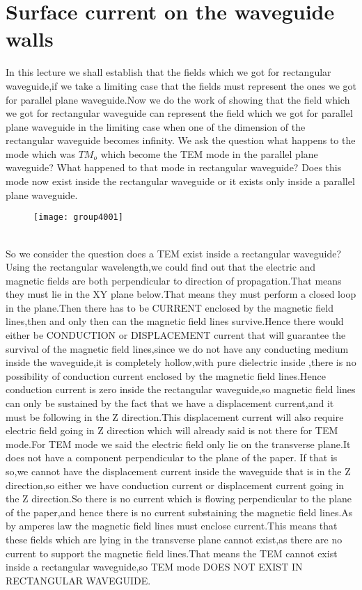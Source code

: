 \chapter{Surface current on the waveguide walls}
	In this lecture we shall establish that the fields which we got for rectangular waveguide,if we take a limiting case that the fields must represent the ones we got for parallel plane waveguide.Now we do the work of showing that the field which we got for rectangular waveguide can represent the field which we got for parallel plane waveguide in the limiting case when one of the dimension of the rectangular waveguide becomes infinity. We ask the question what happens to the mode which was $TM_o$ which become the TEM mode in the parallel plane waveguide? What happened to that mode in rectangular waveguide? Does this mode now exist inside the rectangular waveguide or it exists only inside a parallel plane waveguide.\\
	\begin{figure}[h]
	\centering
	\vspace{-20pt}
	\texttt{[image: group4001]}
	\caption{}
\end{figure}
	 \\ So we consider the question does a TEM exist inside a rectangular waveguide? Using the rectangular wavelength,we could find out that the electric and magnetic fields are both perpendicular to direction of propagation.That means they must lie in the XY plane below.That means they must perform a closed loop in the plane.Then there has to be CURRENT enclosed by the magnetic field lines,then and only then can the magnetic field lines survive.Hence there would either be CONDUCTION or DISPLACEMENT current that will guarantee the survival of the magnetic field lines,since we do not have any conducting medium inside the waveguide,it is completely hollow,with pure dielectric inside ,there is no possibility of conduction current enclosed by the magnetic field lines.Hence conduction current is zero inside the rectangular waveguide,so magnetic field lines can only be sustained by the fact that we have a displacement current,and it must be following in the Z direction.This displacement current will also require electric field going in Z direction which will already said is not there for TEM mode.For TEM mode we said the electric field only lie on the transverse plane.It does not have a component perpendicular to the plane of the paper.
	If that is so,we cannot have the displacement current inside the waveguide that is in the Z direction,so either we have conduction current or displacement current going in the Z direction.So there is no current which is flowing perpendicular to the plane of the paper,and hence there is no current substaining the magnetic field lines.As by amperes law the magnetic field lines must enclose current.This means that these fields which are lying in the transverse plane cannot exist,as there are no current to support the magnetic field lines.That means the TEM cannot exist inside a rectangular waveguide,so TEM mode DOES NOT EXIST IN RECTANGULAR WAVEGUIDE.
